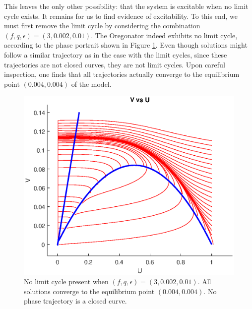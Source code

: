 \documentclass[twocolumn,amsmath,amssymb,aps]{revtex4}
\begin{document}
This leaves the only other possibility: that the system is excitable when no limit cycle exists. It remains for us to find evidence of excitability. To this end, we must first remove the limit cycle by considering the combination $(f,q,\epsilon) = (3,0.002, 0.01)$. The Oregonator indeed exhibits no limit cycle, according to the phase portrait shown in Figure \ref{fig:NoLimitCycle}. Even though solutions might follow a similar trajectory as in the case with the limit cycles, since these trajectories are not closed curves, they are not limit cycles. Upon careful inspection, one finds that all trajectories actually converge to the equilibrium point $(0.004,0.004)$ of the model. 
\begin{figure}[!htb]
	\centering
	\includegraphics[scale=0.6]{no_limit_cycle.eps}
	\caption{No limit cycle present when $(f,q,\epsilon) = (3,0.002, 0.01)$. All solutions converge to the equilibrium point $(0.004,0.004)$. No phase trajectory is a closed curve.}
	\label{fig:NoLimitCycle}
\end{figure}
\end{document}

